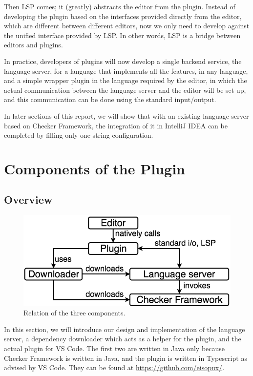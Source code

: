 \documentclass{article}
\begin{document}
Then LSP comes; it (greatly) abstracts the editor from the plugin. Instead of developing the plugin based on the interfaces provided directly from the editor, which are different between different editors, now we only need to develop against the unified interface provided by LSP. In other words, LSP is a bridge between editors and plugins.

In practice, developers of plugins will now develop a single backend service, the language server, for a language that implements all the features, in any language, and a simple wrapper plugin in the language required by the editor, in which the actual communication between the language server and the editor will be set up, and this communication can be done using the standard input/output.

In later sections of this report, we will show that with an existing language server based on Checker Framework, the integration of it in IntelliJ IDEA can be completed by filling only one string configuration.

\section{Components of the Plugin}

\subsection{Overview}

\begin{figure}[ht]
\centering
\includegraphics[scale=0.35]{relation.png}
\caption{Relation of the three components.}
\label{fig:components-relation}
\end{figure}

In this section, we will introduce our design and implementation of the language server, a dependency downloader which acts as a helper for the plugin, and the actual plugin for VS Code. The first two are written in Java only because Checker Framework is written in Java, and the plugin is written in Typescript as advised by VS Code. They can be found at \url{https://github.com/eisopux/}.
\end{document}
